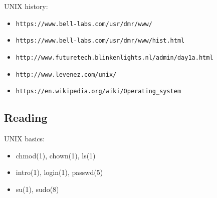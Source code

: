\documentclass[xga]{xdvislides}
\begin{document}
UNIX history:
\begin{itemize}
	\item \verb+https://www.bell-labs.com/usr/dmr/www/+
	\item \verb+https://www.bell-labs.com/usr/dmr/www/hist.html+
	\item \verb+http://www.futuretech.blinkenlights.nl/admin/day1a.html+
	\item \verb+http://www.levenez.com/unix/+
	\item \verb+https://en.wikipedia.org/wiki/Operating_system+
\end{itemize}

\subsection{Reading}
UNIX basics:
\begin{itemize}
	\item chmod(1), chown(1), ls(1)
	\item intro(1), login(1), passwd(5)
	\item su(1), sudo(8)
\end{itemize}

%
%
\end{document}
